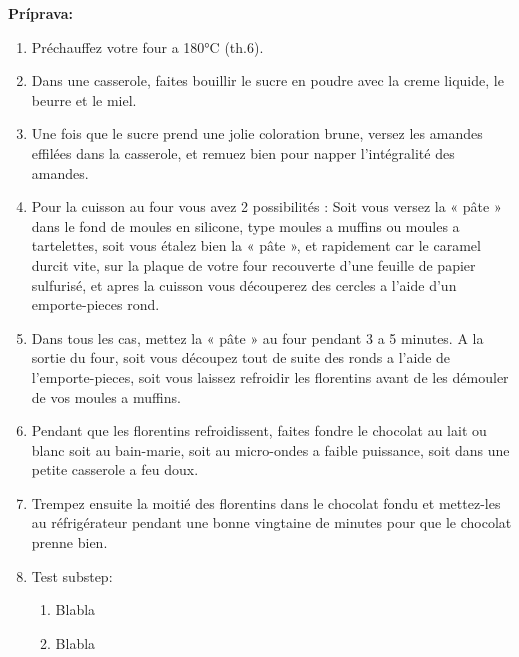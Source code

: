 \begin{recipe}
\textbf{ {\normalsize Príprava:} }
\begin{enumerate}

  \item{Préchauffez votre four a 180°C (th.6).}
  \item{Dans une casserole, faites bouillir le sucre en poudre avec la creme liquide, le beurre et le miel.}
  \item{Une fois que le sucre prend une jolie coloration brune, versez les amandes effilées dans la casserole, et remuez bien pour napper l’intégralité des amandes.}
  \item{Pour la cuisson au four vous avez 2 possibilités : Soit vous versez la « pâte » dans le fond de moules en silicone, type moules a muffins ou moules a tartelettes, soit vous étalez bien la « pâte », et rapidement car le caramel durcit vite, sur la plaque de votre four recouverte d’une feuille de papier sulfurisé, et apres la cuisson vous découperez des cercles a l’aide d’un emporte-pieces rond.}
  \item{Dans tous les cas, mettez la « pâte » au four pendant 3 a 5 minutes. A la sortie du four, soit vous découpez tout de suite des ronds a l’aide de l’emporte-pieces, soit vous laissez refroidir les florentins avant de les démouler de vos moules a muffins.}
  \item{Pendant que les florentins refroidissent, faites fondre le chocolat au lait ou blanc soit au bain-marie, soit au micro-ondes a faible puissance, soit dans une petite casserole a feu doux.}
  \item{Trempez ensuite la moitié des florentins dans le chocolat fondu et mettez-les au réfrigérateur pendant une bonne vingtaine de minutes pour que le chocolat prenne bien.}
  \item{Test substep: }
      \begin{enumerate}
          \item{Blabla}
          \item{Blabla}\end{enumerate}

\end{enumerate}
\end{recipe}

\begin{notes}
  
\end{notes}	
\clearpage
